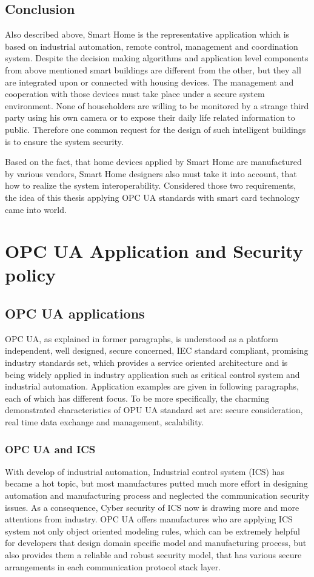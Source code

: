 \subsection{Conclusion}
Also described above, Smart Home is the representative application which is based on industrial automation, remote control, management and coordination system. Despite the decision making algorithms and application level components from above mentioned smart buildings are different from the other, but they all are integrated upon or connected with housing devices. The management and cooperation with those devices must take place under a secure system environment. None of householders are willing to be monitored by a strange third party using his own camera or to expose their daily life related information to public. Therefore one common request for the design of such intelligent buildings is to ensure the system security.

Based on the fact, that home devices applied by Smart Home are manufactured by various vendors,  Smart Home designers also must take it into account, that how to realize the system interoperability. Considered those two requirements, the idea of this thesis applying OPC UA standards with smart card technology came into world. 

\section{OPC UA Application and Security policy }

\subsection{OPC UA applications}
OPC UA, as explained in former paragraphs,  is understood as a platform independent, well designed, secure concerned, IEC standard compliant, promising industry standards set, which provides a service oriented architecture and is being widely applied in industry application such as critical control system and industrial automation. Application examples are given in following paragraphs, each of which has different focus. To be more specifically, the charming demonstrated characteristics of OPU UA standard set are: secure consideration, real time data exchange and management, scalability. 

\subsubsection{OPC UA and ICS}
With develop of industrial automation, Industrial control system (ICS) has became a hot topic, but most manufactures putted much more effort in designing automation and manufacturing process and neglected the communication security issues. As a consequence, Cyber security of ICS now is drawing more and more attentions from industry. OPC UA offers manufactures who are applying ICS system not only object oriented modeling rules, which can be extremely helpful for developers that design domain specific model and manufacturing process, but also provides them a reliable and robust security model\cite{opc_ics}, that has various secure arrangements in each communication protocol stack layer.


